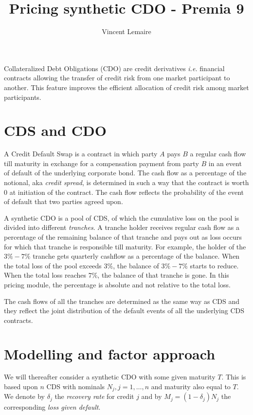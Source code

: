 \documentclass[10pt, a4paper]{article}
\begin{document}
\title{Pricing synthetic CDO - Premia 9}
\author{Vincent Lemaire}
\date{}
\maketitle
\lstset{language=C, 
    basicstyle=\ttfamily,
    keywordstyle=\bfseries,
    commentstyle=\slshape,
    showspaces=false,
    showstringspaces=false}

Collateralized Debt Obligations (CDO) are credit derivatives \emph{i.e.} financial contracts allowing the transfer of credit risk from one market participant to another. This feature improves the efficient allocation of credit risk among market participants.

\section{CDS and CDO}
A Credit Default Swap is a contract in which party $A$ pays $B$ a regular cash flow till maturity in exchange for a compensation payment from party $B$ in an event of default of the underlying corporate bond. The cash flow as a percentage of the notional, aka \emph{credit spread}, is determined in such a way that the contract is worth $0$ at initiation of the contract. The cash flow reflects the probability of the event of default that two parties agreed upon.

A synthetic CDO is a pool of CDS, of which the cumulative loss on the pool is divided into different \emph{tranches}. A tranche holder receives regular cash flow as a percentage of the remaining balance of that tranche and pays out as loss occurs for which that tranche is responsible till maturity. For example, the holder of the $3\%-7\%$ tranche gets quarterly cashflow as a percentage of the balance. When the total loss of the pool exceeds $3\%$, the balance of $3\%-7\%$ starts to reduce. When the total loss reaches $7\%$, the balance of that tranche is gone. In this pricing module, the percentage is absolute and not relative to the total loss. 

The cash flows of all the tranches are determined as the same way as CDS and they reflect the joint distribution of the default events of all the underlying CDS contracts.

\section{Modelling and factor approach}
We will thereafter consider a synthetic CDO with some given maturity $T$. This is based upon $n$ CDS with nominals $N_j, j = 1,\dots,n$ and maturity also equal to $T$. We denote by $\delta_j$ the \emph{recovery rate} for credit $j$ and by $M_j = (1 - \delta_j) N_j$ the corresponding \emph{loss given default}. 
\end{document}
